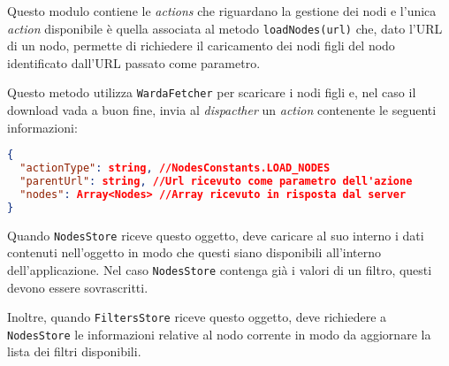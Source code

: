 Questo modulo contiene le \textit{actions} che riguardano la gestione dei nodi e l'unica \textit{action} disponibile è quella associata al metodo \texttt{loadNodes(url)} che, dato l'URL di un nodo, permette di richiedere il caricamento dei nodi figli del nodo identificato dall'URL passato come parametro.

Questo metodo utilizza \texttt{WardaFetcher} per scaricare i nodi figli e, nel caso il download vada a buon fine, invia al \textit{dispacther} un \textit{action} contenente le seguenti informazioni:
\begin{lstlisting}[language=JSON, caption=Action: load nodes]
{
  "actionType": string, //NodesConstants.LOAD_NODES
  "parentUrl": string, //Url ricevuto come parametro dell'azione
  "nodes": Array<Nodes> //Array ricevuto in risposta dal server
}
\end{lstlisting}

Quando \texttt{NodesStore} riceve questo oggetto, deve caricare al suo interno i dati contenuti nell'oggetto in modo che questi siano disponibili all'interno dell'applicazione. Nel caso \texttt{NodesStore} contenga già i valori di un filtro, questi devono essere sovrascritti.

Inoltre, quando \texttt{FiltersStore} riceve questo oggetto, deve richiedere a \texttt{NodesStore} le informazioni relative al nodo corrente in modo da aggiornare la lista dei filtri disponibili.